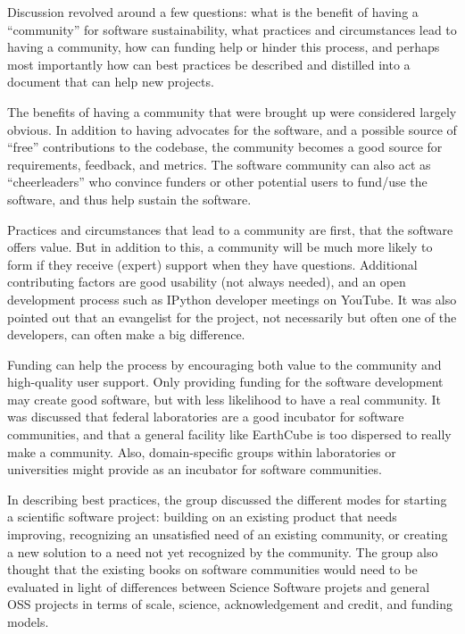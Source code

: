 Discussion revolved around a few questions: what is the benefit of having a ``community'' for software sustainability, what
practices and circumstances lead to having a community, how can funding help or hinder this process, and perhaps most
importantly how can best practices be described and distilled into a document that can help new projects.

The benefits of having a community that were brought up were considered largely obvious. In addition to having advocates for
the software, and a possible source of ``free'' contributions to the codebase, the community becomes a good source for
requirements, feedback, and metrics. The software community can also act as ``cheerleaders'' who convince funders or other
potential users to fund/use the software, and thus help sustain the software.

Practices and circumstances that lead to a community are first, that the software offers value. But in addition to this, a
community will be much more likely to form if they receive (expert) support when they have questions. Additional contributing
factors are good usability (not always needed), and an open development process such as IPython developer meetings on YouTube.
It was also pointed out that an evangelist for the project, not necessarily but often one of the developers, can often make a
big difference. 

Funding can help the process by encouraging both value to the community and high-quality user support. Only providing funding
for the software development may create good software, but with less likelihood to have a real community. It was discussed
that federal laboratories are a good incubator for software communities, and that a general facility like EarthCube is too
dispersed to really make a community. Also, domain-specific groups within laboratories or universities might provide as an
incubator for software communities.

In describing best practices, the group discussed the different modes for starting a scientific software project: building on
an existing product that needs improving, recognizing an unsatisfied need of an existing community, or creating a new solution
to a need not yet recognized by the community. The group also thought that the existing books on software communities would
need to be evaluated in light of differences between Science Software projets and general OSS projects in terms of scale,
science, acknowledgement and credit, and funding models.

